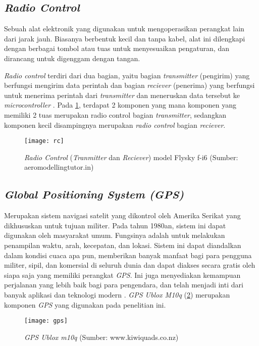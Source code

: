 \subsection{\textit{Radio Control}}
Sebuah alat elektronik yang digunakan untuk mengoperasikan perangkat lain dari jarak jauh. Biasanya berbentuk kecil dan tanpa kabel, alat ini dilengkapi dengan berbagai tombol atau tuas untuk menyesuaikan pengaturan, dan dirancang untuk digenggam dengan tangan.

\textit{Radio control} terdiri dari dua bagian, yaitu bagian \textit{transmitter} (pengirim) yang berfungsi mengirim data perintah dan bagian \textit{reciever} (penerima) yang berfungsi untuk menerima perintah dari \textit{transmitter} dan meneruskan data tersebut ke \textit{microcontroller} \citep{mediyutansyah2020perancangan}. Pada \cref{fig:rc}, terdapat 2 komponen yang mana komponen yang memiliki 2 tuas merupakan radio control bagian \textit{transmitter}, sedangkan komponen kecil disampingnya merupakan \textit{radio control} bagian \textit{reciever}.

\begin{figure}[H]
	\centering
	\texttt{[image: rc]}
	\caption{\textit{Radio Control} (\textit{Tranmitter} dan \textit{Reciever}) model Flysky f-i6 (Sumber: aeromodellingtutor.in)}
	\label{fig:rc}
\end{figure}

\subsection{\textit{Global Positioning System (GPS)} }
Merupakan sistem navigasi satelit yang dikontrol oleh Amerika Serikat yang dikhususkan untuk tujuan militer. Pada tahun 1980an, sistem ini dapat digunakan oleh masyarakat umum. Fungsinya adalah untuk melakukan penampilan waktu, arah, kecepatan, dan lokasi. Sistem ini dapat diandalkan dalam kondisi cuaca apa pun, memberikan banyak manfaat bagi para pengguna militer, sipil, dan komersial di seluruh dunia dan dapat diakses secara gratis oleh siapa saja yang memiliki perangkat \textit{GPS}. Ini juga menyediakan kemampuan perjalanan yang lebih baik bagi para pengendara, dan telah menjadi inti dari banyak aplikasi dan teknologi modern \citep{ali2020global}. \textit{GPS Ublox M10q} (\cref{fig:gps}) merupakan komponen \textit{GPS} yang digunakan pada penelitian ini.

\begin{figure}[H]
	\centering
	\texttt{[image: gps]}
	\caption{\textit{GPS Ublox m10q} (Sumber: www.kiwiquads.co.nz)}
	\label{fig:gps}
\end{figure}

